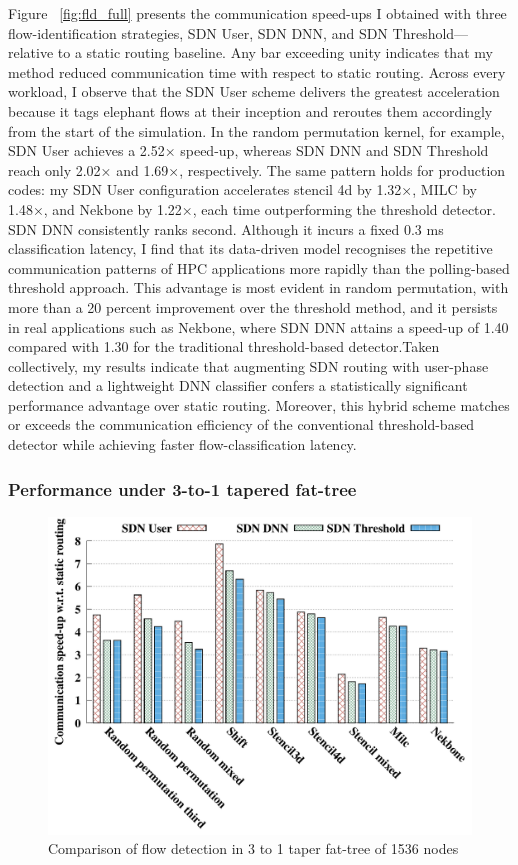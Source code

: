 Figure ~\ref{fig:fld_full} presents the communication speed-ups I obtained with three flow-identification strategies, SDN User, SDN DNN, and SDN Threshold—relative to a static routing baseline. Any bar exceeding unity indicates that my method reduced communication time with respect to static routing. Across every workload, I observe that the SDN User scheme delivers the greatest acceleration because it tags elephant flows at their inception and reroutes them accordingly from the start of the simulation. In the random permutation kernel, for example, SDN User achieves a 2.52× speed-up, whereas SDN DNN and SDN Threshold reach only 2.02× and 1.69×, respectively. The same pattern holds for production codes: my SDN User configuration accelerates stencil 4d by 1.32×, MILC by 1.48×, and Nekbone by 1.22×, each time outperforming the threshold detector. SDN DNN consistently ranks second. Although it incurs a fixed 0.3 ms classification latency, I find that its data-driven model recognises the repetitive communication patterns of HPC applications more rapidly than the polling-based threshold approach. This advantage is most evident in random permutation, with more than a 20 percent improvement over the threshold method, and it persists in real applications such as Nekbone, where SDN DNN attains a speed-up of 1.40 compared with 1.30 for the traditional threshold-based detector.Taken collectively, my results indicate that augmenting SDN routing with user-phase detection and a lightweight DNN classifier confers a statistically significant performance advantage over static routing. Moreover, this hybrid scheme matches or exceeds the communication efficiency of the conventional threshold-based detector while achieving faster flow-classification latency.

\subsubsection{Performance under 3-to-1 tapered fat-tree}
\begin{figure}[h]
  \centering
  \includegraphics[width=\columnwidth]{./figs_4/taper_fat_flow_detection.pdf}
  \caption{Comparison of flow detection in 3 to 1 taper fat-tree of 1536 nodes}
  \label{fig:fld_taper}
\end{figure}


